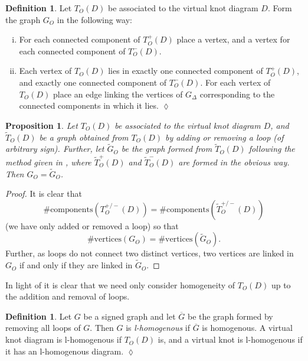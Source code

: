 \documentclass[10pt,oneside]{amsart}
\newtheorem{proposition}[theorem]{Proposition}
\theoremstyle{definition}
\newtheorem{definition}[theorem]{Definition}
\numberwithin{equation}{section}
\DeclareRobustCommand{\CloseDef}{	\leavevmode\unskip\penalty9999 \hbox{}\nobreak\hfill
	\quad\hbox{$\lozenge$}}
\begin{document}
\begin{definition}\label{Def:gdelta}
	Let \( T_O ( D ) \) be associated to the virtual knot diagram \( D \). Form the graph \( G_{O} \) in the following way:
	\begin{enumerate}[(i)]
		\item For each connected component of \( T^+_O ( D ) \) place a vertex, and a vertex for each connected component of \( T^-_O ( D ) \).
		\item Each vertex of \( T_O ( D ) \) lies in exactly one connected component of \( T^+_O ( D ) \), and exactly one connected component of \( T^-_O ( D ) \). For each vertex of \( T_O ( D ) \) place an edge linking the vertices of \( G_\Delta \) corresponding to the connected components in which it lies.\CloseDef
	\end{enumerate}
\end{definition}

\begin{proposition}
	\label{Prop:removingselfedges}
	Let \( T_O ( D ) \) be associated to the virtual knot diagram \( D \), and \( \widetilde{T}_O ( D ) \) be a graph obtained from \( T_O ( D ) \) by adding or removing a loop (of arbitrary sign). Further, let \( \widetilde{G}_O \) be the graph formed from \( \widetilde{T}_O ( D ) \) following the method given in , where \( \widetilde{T}^+_O ( D ) \) and \( \widetilde{T}^-_O ( D ) \) are formed in the obvious way. Then \( G_O = \widetilde{G}_O \).
\end{proposition}

\begin{proof}
	It is clear that
		\begin{equation*}
			\# \text{components} ( T^{+/-}_O ( D ) ) = \# \text{components} ( \widetilde{T}^{+/-}_O ( D ) )
		\end{equation*}
	(we have only added or removed a loop) so that
		\begin{equation*}
			\# \text{vertices} ( G_O ) = \# \text{vertices} ( \widetilde{G}_O ).
		\end{equation*}
	Further, as loops do not connect two distinct vertices, two vertices are linked in \( G_O \) if and only if they are linked in \( \widetilde{G}_O \).
\end{proof}

In light of  it is clear that we need only consider homogeneity of \( T_O ( D ) \) up to the addition and removal of loops.

\begin{definition}
	\label{Def:lhom}
	Let \( G \) be a signed graph and let \( \overline{G} \) be the graph formed by removing all loops of \( G \). Then \( G \) is \emph{l-homogenous} if \( \overline{G} \) is homogenous. A virtual knot diagram is l-homogenous if \( T_O ( D ) \) is, and a virtual knot is l-homogenous if it has an l-homogenous diagram.\CloseDef
\end{definition}
\end{document}
